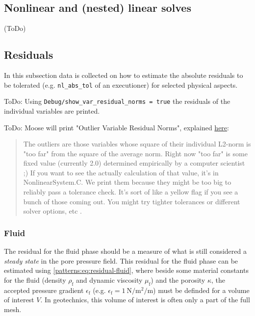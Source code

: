\subsection{Nonlinear and (nested) linear solves}

(ToDo)

\subsection{Residuals}

In this subsection data is collected on how to estimate the absolute residuals
to be tolerated (e.g. \texttt{nl\_abs\_tol} of an executioner) for selected
physical aspects.

ToDo: Using \texttt{Debug/show\_var\_residual\_norms = true} the residuals of
the individual variables are printed.

ToDo: Moose will print "Outlier Variable Residual Norms", explained
\href{https://groups.google.com/g/moose-users/c/76wkbH-cuFo/m/OT1Z6vbrm_0J}{here}:
\begin{quote}
  The outliers are those variables whose square of their individual L2-norm is
  "too far" from the square of the average norm. Right now "too far" is some
  fixed value (currently 2.0) determined empirically by a computer scientist ;)
  If you want to see the actually calculation of that value, it's in
  NonlinearSystem.C. We print them because they might be too big to reliably pass
  a tolerance check. It's sort of like a yellow flag if you see a bunch of those
  coming out. You might try tighter tolerances or different solver options, etc .
\end{quote}


\subsubsection{Fluid}

The residual for the fluid phase should be a measure of what is still
considered a \emph{steady state} in the pore pressure field. This residual for
the fluid phase can be estimated using \autoref{patterns:eq:residual-fluid},
where beside some material constants for the fluid (density $\rho_\mathrm{f}$
and dynamic viscosity $\mu_\mathrm{f}$) and the porosity $\kappa$, the accepted
pressure gradient $\epsilon_\mathrm{f}$ (e.g. $\epsilon_\mathrm{f} =
  \qty[per-mode = symbol]{1}{\newton\per\square\metre\per\metre} $) must be
definded for a volume of interest $V$. In geotechnics, this volume of interest
is often only a part of the full mesh.


